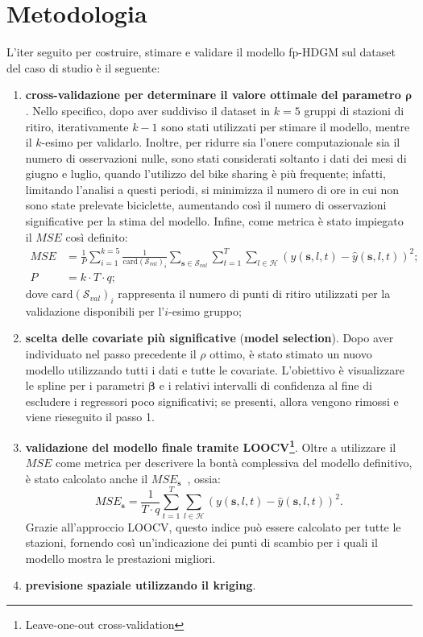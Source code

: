 \section{Metodologia}
L'iter seguito per costruire, stimare e validare il modello fp-HDGM sul dataset del caso di studio è il seguente:
\begin{enumerate}
	\item \textbf{cross-validazione per determinare il valore ottimale del parametro $\boldsymbol{\rho}$}. Nello specifico, dopo aver suddiviso il dataset in $k=5$ gruppi di stazioni di ritiro, iterativamente $k-1$ sono stati utilizzati per stimare il modello, mentre il $k$-esimo per validarlo. Inoltre, per ridurre sia l'onere computazionale sia il numero di osservazioni nulle, sono stati considerati soltanto i dati dei mesi di giugno e luglio, quando l'utilizzo del bike sharing è più frequente; infatti, limitando l'analisi a questi periodi, si minimizza il numero di ore in cui non sono state prelevate biciclette, aumentando così il numero di osservazioni significative per la stima del modello. Infine, come metrica è stato impiegato il $MSE$ così definito:
	\begin{equation}
		\begin{aligned}
			MSE &= \frac{1}{P}\sum_{i=1}^{k=5}\frac{1}{\text{card}(\mathcal{S}_{val})_i}\sum_{\mathbf{s}\in\mathcal{S}_{val}}^{}\sum_{t=1}^{T}\sum_{l\in\mathcal{H}}^{} (y(\mathbf{s}, l, t) - \hat{y}(\mathbf{s}, l, t))^2; \\
			P &= k\cdot T\cdot q;
		\end{aligned}
	\end{equation}
	dove $\text{card}(\mathcal{S}_{val})_i$ rappresenta il numero di punti di ritiro utilizzati per la validazione disponibili per l'$i$-esimo gruppo;
	\item \textbf{scelta delle covariate più significative} (\textbf{model selection}). Dopo aver individuato nel passo precedente il $\rho$ ottimo, è stato stimato un nuovo modello utilizzando tutti i dati e tutte le covariate. L'obiettivo è visualizzare le spline per i parametri $\boldsymbol{\beta}$ e i relativi intervalli di confidenza al fine di escludere i regressori poco significativi; se presenti, allora vengono rimossi e viene rieseguito il passo \num{1}.
	\item \textbf{validazione del modello finale tramite LOOCV\footnote{Leave-one-out cross-validation}}. Oltre a utilizzare il $MSE$ come metrica per descrivere la bontà complessiva del modello definitivo, è stato calcolato anche il $MSE_\mathbf{s}$~\citep{paper_f_HDGM}, ossia:
	\begin{equation}
		MSE_\mathbf{s} = \frac{1}{T\cdot q}\sum_{t=1}^{T}\sum_{l\in\mathcal{H}}^{} (y(\mathbf{s}, l, t) - \hat{y}(\mathbf{s}, l, t))^2.
	\end{equation}
	Grazie all'approccio LOOCV, questo indice può essere calcolato per tutte le stazioni, fornendo così un'indicazione dei punti di scambio per i quali il modello mostra le prestazioni migliori.
	\item \textbf{previsione spaziale utilizzando il kriging}.
\end{enumerate}

